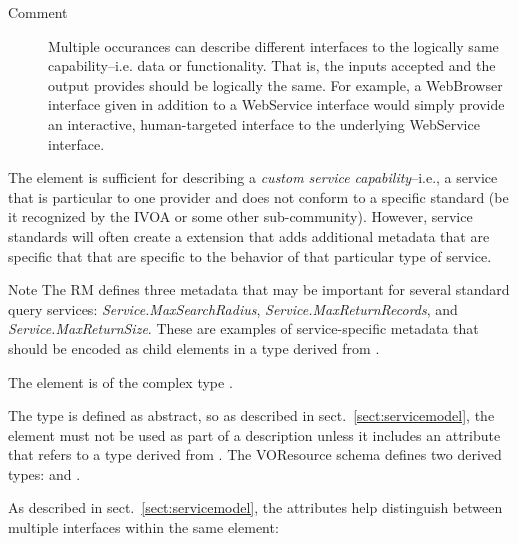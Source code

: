\documentclass[11pt,a4paper]{ivoa}
\begin{document}
\begin{bigdescription}
\begin{description}
\item[Comment] 
                  Multiple occurances can describe different interfaces to 
                  the logically same capability--i.e. data or functionality.
                  That is, the inputs accepted and the output provides should
                  be logically the same.  For example, a WebBrowser interface
                  given in addition to a WebService interface would simply 
                  provide an interactive, human-targeted interface to the 
                  underlying WebService interface.  
               

\end{description}


\end{bigdescription}\endgroup

\endgroup


The  element is sufficient for describing a
\emph{custom service capability}--i.e., a service that is
particular to one provider and does not conform to a specific standard 
(be it recognized by the IVOA or some other sub-community).  However,
service standards will often create a 
extension that adds additional metadata that are specific that that
are specific to the behavior of that particular type of service.  



\begin{admonition}{Note}
The RM defines three metadata that may be
important for several standard query services:
\emph{Service.MaxSearchRadius},
\emph{Service.MaxReturnRecords}, and
\emph{Service.MaxReturnSize}.  These are examples of
service-specific metadata that should be encoded as child
elements in a type derived from .  
\end{admonition}


The  element is of the complex type 
.

The  type is defined as abstract, so as described in
sect.~\ref{sect:servicemodel}, the  element must not be
used as part of a  description unless it includes an
 attribute that refers to a type derived from
. The VOResource schema defines two derived
 types:  and
.

As described in sect.~\ref{sect:servicemodel}, the 
attributes help distinguish between multiple interfaces within the same
 element:
\end{document}
